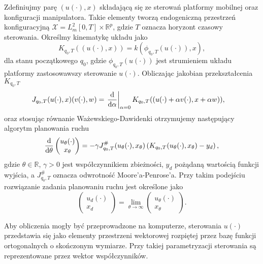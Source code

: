 Zdefiniujmy parę $(u(\cdot), x)$ składającą się ze sterowań platformy mobilnej oraz konfiguracji manipulatora. Takie elementy tworzą endogeniczną przestrzeń konfiguracyjną $\mathcal{X} = L_m^2[0, T] \times \mathbb{R}^p$, gdzie $T$ oznacza horyzont czasowy sterowania. Określmy kinematykę układu jako
\begin{equation}
K_{q_0, T}((u(\cdot), x)) = k(\phi_{q_0, T}(u(\cdot)), x),
\end{equation} dla stanu początkowego $q_0$, gdzie $\phi_{q_0, T}(u(\cdot))$ jest strumieniem układu platformy zastosowawszy sterowanie $u(\cdot)$. Obliczając jakobian przekształcenia $K_{q_0, T}$
\begin{align}
\label{eq:jacobian}
J_{q_0, T}(u(\cdot), x)(v(\cdot), w) &= \left.\frac{\mathrm{d}}{\mathrm{d} \alpha}\right|_{\alpha=0} K_{q_0, T}((u(\cdot)+\alpha v(\cdot), x+\alpha w)),
\end{align}
oraz stosując równanie Ważewskiego-Dawidenki otrzymujemy następujący algorytm planowania ruchu
\begin{equation}
\label{eq:endogen_alg}
\dfrac{\mathrm{d}}{\mathrm{d} \theta}\begin{pmatrix}
u_\theta(\cdot)\\ x_\theta
\end{pmatrix}=-\gamma J^\#_{q_0, T}(u_\theta(\cdot), x_\theta)\left( K_{q_0, T}(u_\theta(\cdot), x_\theta)-y_d\right),
\end{equation}
gdzie $\theta\in\mathbb{R}$, $\gamma>0$ jest współczynnikiem zbieżności, $y_d$ pożądaną wartością funkcji wyjścia, a $J^\#_{q_0, T}$ oznacza odwrotność Moore'a-Penrose'a. Przy takim podejściu rozwiązanie zadania planowaniu ruchu jest określone jako
\begin{equation}
\begin{pmatrix}
u_d(\cdot)\\ x_d
\end{pmatrix}=\lim_{\theta\rightarrow\infty}\begin{pmatrix}
u_\theta(\cdot)\\ x_\theta
\end{pmatrix}.
\end{equation}

Aby obliczenia mogły być przeprowadzone na komputerze, sterowania $u(\cdot)$ przedstawia się jako elementy przestrzeni wektorowej rozpiętej przez bazę funkcji ortogonalnych o skończonym wymiarze. Przy takiej parametryzacji sterowania są reprezentowane przez wektor współczynników. 


